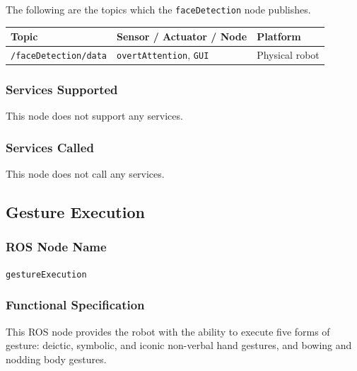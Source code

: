 \documentclass{CSSRforAfrica}
\begin{document}
{The following are the topics which the \small \texttt{faceDetection}   node publishes.
 
\begin{center}
\begin{tabularx}{\linewidth}{| l | l | X|}
\hline 
{\small Topic }                                                                                & {\small Sensor / Actuator / Node}    &  {\small Platform}       \\
\hline
{\footnotesize \verb+/faceDetection/data+ }  & {\footnotesize \verb+overtAttention+, \verb+GUI+ } & {\small Physical robot} \\ 
\hline
\end{tabularx}
\end{center}

\subsubsection*{Services Supported}
This node  does not support any services.

\subsubsection*{Services Called}
This node does not call any services.






 
\newpage

\subsection{Gesture Execution }

\subsubsection*{ROS Node Name}
 {\small \verb+gestureExecution+}   

\subsubsection*{Functional Specification}
This ROS node  provides the robot with the ability to execute five forms of gesture: deictic, symbolic, and iconic non-verbal hand gestures, and bowing and nodding body gestures. 
 
}
\end{document}
